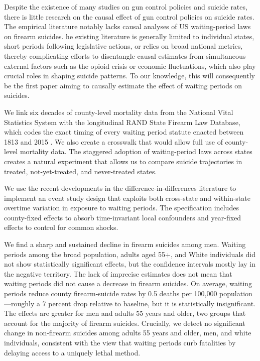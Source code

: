 Despite the existence of many studies on gun control policies and suicide rates, there is little research on the causal effect of gun control policies on suicide rates. The empirical literature notably lacks causal analyses of US waiting-period laws on firearm suicides. he existing literature is generally limited to individual states, short periods following legislative actions, or relies on broad national metrics, thereby complicating efforts to disentangle causal estimates from simultaneous external factors such as the opioid crisis or economic fluctuations, which also play crucial roles in shaping suicide patterns. To our knowledge, this will consequently be the first paper aiming to causally estimate the effect of waiting periods on suicides. 

We link six decades of county-level mortality data from the National Vital Statistics System with the longitudinal RAND State Firearm Law Database, which codes the exact timing of every waiting period statute enacted between 1813 and 2015 \autocite{statisticsNationalVitalStatistics2007,cherneyDevelopmentRANDState2022}. We also create a crosswalk that would allow full use of county-level mortality data. The staggered adoption of waiting-period laws across states creates a natural experiment that allows us to compare suicide trajectories in treated, not-yet-treated, and never-treated states.

We use the recent developments in the difference-in-differences literature to implement an event study design that exploits both cross-state and within-state overtime variation in exposure to waiting periods. The specification includes county-fixed effects to absorb time-invariant local confounders and year-fixed effects to control for common shocks. 

We find a sharp and sustained decline in firearm suicides among men. Waiting periods among the broad population, adults aged 55+, and White individuals did not show statistically significant effects, but the confidence intervals mostly lay in the negative territory. The lack of imprecise estimates does not mean that waiting periods did not cause a decrease in firearm suicides. On average, waiting periods reduce county firearm-suicide rates by 0.5 deaths per 100,000 population—roughly a 7 percent drop relative to baseline, but it is statistically insignificant. The effects are greater for men and adults 55 years and older, two groups that account for the majority of firearm suicides. Crucially, we detect no significant change in non-firearm suicides among adults 55 years and older, men, and white individuals, consistent with the view that waiting periods curb fatalities by delaying access to a uniquely lethal method.

